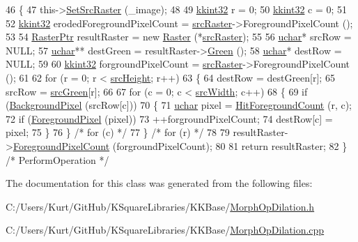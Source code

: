 \begin{DoxyCode}
46 \{
47   this->\hyperlink{class_k_k_b_1_1_morph_op_a07c75e151d9b95ca13da3bfc2e48dba4}{SetSrcRaster} (\_image);
48 
49   \hyperlink{namespace_k_k_b_a8fa4952cc84fda1de4bec1fbdd8d5b1b}{kkint32}  r = 0;
50   \hyperlink{namespace_k_k_b_a8fa4952cc84fda1de4bec1fbdd8d5b1b}{kkint32}  c = 0;
51 
52   \hyperlink{namespace_k_k_b_a8fa4952cc84fda1de4bec1fbdd8d5b1b}{kkint32}  erodedForegroundPixelCount = \hyperlink{class_k_k_b_1_1_morph_op_a9af0ebff0135d124c7d1d17e21c4d7e6}{srcRaster}->ForegroundPixelCount ();
53 
54   \hyperlink{class_k_k_b_1_1_raster}{RasterPtr} resultRaster = \textcolor{keyword}{new} \hyperlink{class_k_k_b_1_1_raster}{Raster} (*\hyperlink{class_k_k_b_1_1_morph_op_a9af0ebff0135d124c7d1d17e21c4d7e6}{srcRaster});
55 
56   \hyperlink{namespace_k_k_b_ace9969169bf514f9ee6185186949cdf7}{uchar}*    srcRow     = NULL;
57   \hyperlink{namespace_k_k_b_ace9969169bf514f9ee6185186949cdf7}{uchar}**   destGreen  = resultRaster->\hyperlink{class_k_k_b_1_1_raster_a2dbd81f2cb60b3716bcf6467050dde93}{Green} ();
58   \hyperlink{namespace_k_k_b_ace9969169bf514f9ee6185186949cdf7}{uchar}*    destRow    = NULL;
59 
60   \hyperlink{namespace_k_k_b_a8fa4952cc84fda1de4bec1fbdd8d5b1b}{kkint32}  forgroundPixelCount = \hyperlink{class_k_k_b_1_1_morph_op_a9af0ebff0135d124c7d1d17e21c4d7e6}{srcRaster}->ForegroundPixelCount ();
61 
62   \textcolor{keywordflow}{for}  (r = 0;  r < \hyperlink{class_k_k_b_1_1_morph_op_a54b2ce1b398a80803b4dbe8aef956b51}{srcHeight};  r++)
63   \{
64     destRow = destGreen[r];
65     srcRow  = \hyperlink{class_k_k_b_1_1_morph_op_ab811c702f7e0c8ffccdd21111c8144ab}{srcGreen}[r];
66 
67     \textcolor{keywordflow}{for}  (c = 0; c < \hyperlink{class_k_k_b_1_1_morph_op_aec2cfb3015497e4077751fc5f19559ab}{srcWidth}; c++)
68     \{
69       \textcolor{keywordflow}{if}  (\hyperlink{class_k_k_b_1_1_morph_op_a300c5117659d224d78f7b5a8d44ded91}{BackgroundPixel} (srcRow[c]))
70       \{
71         \hyperlink{namespace_k_k_b_ace9969169bf514f9ee6185186949cdf7}{uchar}  pixel = \hyperlink{class_k_k_b_1_1_morph_op_struct_a4b9e013e6850f097999d72175ded3f85}{HitForegroundCount} (r, c);
72         \textcolor{keywordflow}{if}  (\hyperlink{class_k_k_b_1_1_morph_op_acd5541050c3c0207b004b71caf7fb1f4}{ForegroundPixel} (pixel))
73           ++forgroundPixelCount;
74         destRow[c] = pixel;
75       \}
76     \}  \textcolor{comment}{/* for (c) */}
77   \}  \textcolor{comment}{/* for (r) */}
78 
79   resultRaster->\hyperlink{class_k_k_b_1_1_raster_a38425a410e40696276be4f22de702eb6}{ForegroundPixelCount} (forgroundPixelCount);
80 
81   \textcolor{keywordflow}{return}  resultRaster;
82 \}  \textcolor{comment}{/* PerformOperation */}
\end{DoxyCode}


The documentation for this class was generated from the following files\+:\begin{DoxyCompactItemize}
\item 
C\+:/\+Users/\+Kurt/\+Git\+Hub/\+K\+Square\+Libraries/\+K\+K\+Base/\hyperlink{_morph_op_dilation_8h}{Morph\+Op\+Dilation.\+h}\item 
C\+:/\+Users/\+Kurt/\+Git\+Hub/\+K\+Square\+Libraries/\+K\+K\+Base/\hyperlink{_morph_op_dilation_8cpp}{Morph\+Op\+Dilation.\+cpp}\end{DoxyCompactItemize}
